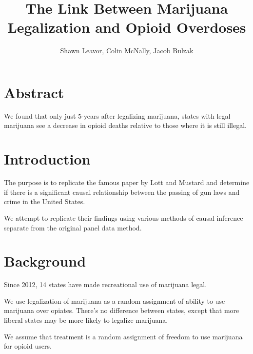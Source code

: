\documentclass{article}
\title{The Link Between Marijuana Legalization and Opioid Overdoses} %
\author{Shawn Leavor, Colin McNally, Jacob Bulzak} %
\begin{document}
\maketitle %



\section*{Abstract} %

We found that only just 5-years after legalizing marijuana, states with legal marijuana see a decrease in opioid deaths relative to those where it is still illegal. 

\section*{Introduction} %

The purpose is to replicate the famous paper by Lott and Mustard and determine if there is a significant causal relationship between the passing of gun laws and crime in the United States.

We attempt to replicate their findings using various methods of causal inference separate from the original panel data method.


\section*{Background} %

Since 2012, 14 states have made recreational use of marijuana legal. 

We use legalization of marijuana as a random assignment of ability to use marijuana over opiates. There's no difference between states, except that more liberal states may be more likely to legalize marijuana. 

We assume that treatment is a random assignment of freedom to use marijuana for opioid users. 


\end{document}
